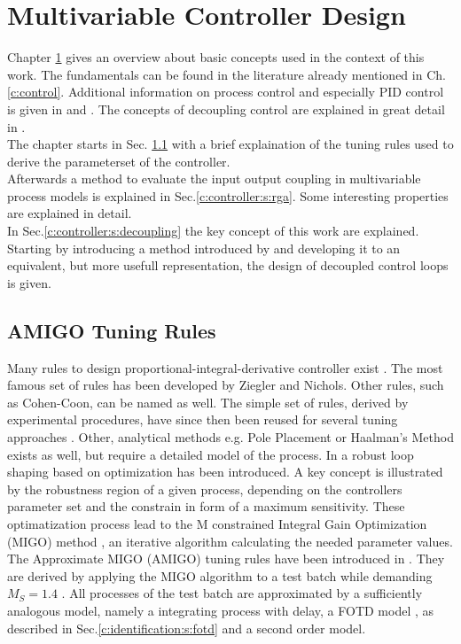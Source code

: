\chapter{Multivariable Controller Design}%
\label{c:controller}

Chapter \ref{c:controller} gives an overview about basic concepts used in the context of this work. The fundamentals can be found in the literature already mentioned in Ch.\ref{c:control}. Additional information on process control and especially PID control is given in \cite{Astrom1995} and \cite{Astrom2006}. The concepts of decoupling control are explained in great detail in \cite{Wang2006}.\\

The chapter starts in Sec. \ref{c:controller:s:AMIGO} with a brief explaination of the tuning rules used to derive the parameterset of the controller. \\

Afterwards a method to evaluate the input output coupling in multivariable process models is explained in Sec.\ref{c:controller:s:rga}. Some interesting properties are explained in detail.\\

In Sec.\ref{c:controller:s:decoupling} the key concept of this work are explained. Starting by introducing a method introduced by \cite{Astrom2001a} and developing it to an equivalent, but more usefull representation, the design of decoupled control loops is given. \\

\section{AMIGO Tuning Rules} %
\label{c:controller:s:AMIGO}

Many rules to design proportional-integral-derivative controller exist \cite[p.158 ff.]{Astrom2006}. The most famous set of rules has been developed by Ziegler and Nichols. Other rules, such as Cohen-Coon, can be named as well. The simple set of rules, derived by experimental procedures, have since then been reused for several tuning approaches \cite[p.169]{Astrom2006}. Other, analytical methods e.g. Pole Placement or Haalman's Method exists as well, but require a detailed model of the process.  In \cite[p.206 ff.]{Astrom2006} a robust loop shaping based on optimization has been introduced. A key concept is illustrated by the robustness region of a given process, depending on the controllers parameter set and the constrain in form of a maximum sensitivity. These optimatization process lead to the M constrained Integral Gain Optimization (MIGO) method \cite[p.217]{Astrom2006}, an iterative algorithm calculating the needed parameter values.
The Approximate MIGO (AMIGO) tuning rules have been introduced in \cite[p.225 ff.]{Astrom2006}. They are derived by applying the MIGO algorithm to a test batch while demanding $M_S = 1.4$ . All processes of the test batch are approximated by a sufficiently analogous model, namely a integrating process with delay, a FOTD model , as described in Sec.\ref{c:identification:s:fotd} and a second order model. \\


